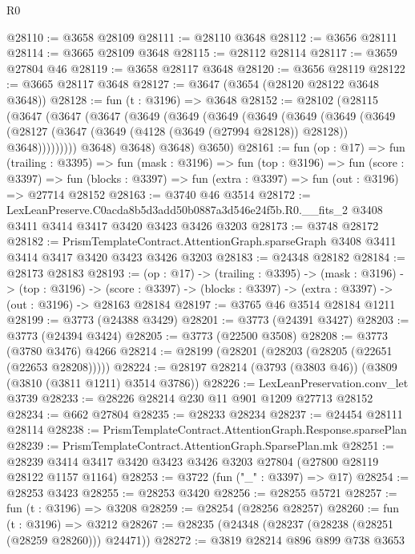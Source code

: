 \begin{lexlean}{R0}
\begin{coremodule}
@28110 := @3658 @28109
@28111 := @28110 @3648
@28112 := @3656 @28111
@28114 := @3665 @28109 @3648
@28115 := @28112 @28114
@28117 := @3659 @27804 @46
@28119 := @3658 @28117 @3648
@28120 := @3656 @28119
@28122 := @3665 @28117 @3648
@28127 := @3647 (@3654 (@28120 @28122 @3648 @3648))
@28128 := fun (t : @3196) => @3648
@28152 := @28102
    (@28115
      (@3647
        (@3647
          (@3647
            (@3649
              (@3649
                (@3649
                  (@3649
                    (@3649
                      (@3649
                        (@3649
                          (@28127
                            (@3647 (@3649 (@4128 (@3649 (@27994 @28128)) @28128)) @3648)))))))))
            @3648)
          @3648)
        @3648)
      @3650)
@28161 := fun (op : @17) =>
  fun (trailing : @3395) =>
  fun (mask : @3196) =>
  fun (top : @3196) =>
  fun (score : @3397) =>
  fun (blocks : @3397) => fun (extra : @3397) => fun (out : @3196) => @27714 @28152
@28163 := @3740 @46 @3514
@28172 := LexLeanPreserve.C0acda8b5d3add50b0887a3d546e24f5b.R0.__fits_2
    @3408
    @3411
    @3414
    @3417
    @3420
    @3423
    @3426
    @3203
@28173 := @3748 @28172
@28182 := PrismTemplateContract.AttentionGraph.sparseGraph
    @3408
    @3411
    @3414
    @3417
    @3420
    @3423
    @3426
    @3203
@28183 := @24348 @28182
@28184 := @28173 @28183
@28193 := (op : @17) ->
  (trailing : @3395) ->
  (mask : @3196) ->
  (top : @3196) ->
  (score : @3397) -> (blocks : @3397) -> (extra : @3397) -> (out : @3196) -> @28163 @28184
@28197 := @3765 @46 @3514 @28184 @1211
@28199 := @3773 (@24388 @3429)
@28201 := @3773 (@24391 @3427)
@28203 := @3773 (@24394 @3424)
@28205 := @3773 (@22500 @3508)
@28208 := @3773 (@3780 @3476) @4266
@28214 := @28199 (@28201 (@28203 (@28205 (@22651 (@22653 @28208)))))
@28224 := @28197 @28214 (@3793 (@3803 @46)) (@3809 (@3810 (@3811 @1211) @3514 @3786))
@28226 := LexLeanPreservation.conv_let @3739
@28233 := @28226 @28214 @230 @11 @901 @1209 @27713 @28152
@28234 := @662 @27804
@28235 := @28233 @28234
@28237 := @24454 @28111 @28114
@28238 := PrismTemplateContract.AttentionGraph.Response.sparsePlan
@28239 := PrismTemplateContract.AttentionGraph.SparsePlan.mk
@28251 := @28239 @3414 @3417 @3420 @3423 @3426 @3203 @27804 (@27800 @28119 @28122 @1157 @1164)
@28253 := @3722 (fun ("_" : @3397) => @17)
@28254 := @28253 @3423
@28255 := @28253 @3420
@28256 := @28255 @5721
@28257 := fun (t : @3196) => @3208
@28259 := @28254 (@28256 @28257)
@28260 := fun (t : @3196) => @3212
@28267 := @28235 (@24348 (@28237 (@28238 (@28251 (@28259 @28260))) @24471))
@28272 := @3819 @28214 @896 @899 @738 @3653

\end{coremodule}
\end{lexlean}
